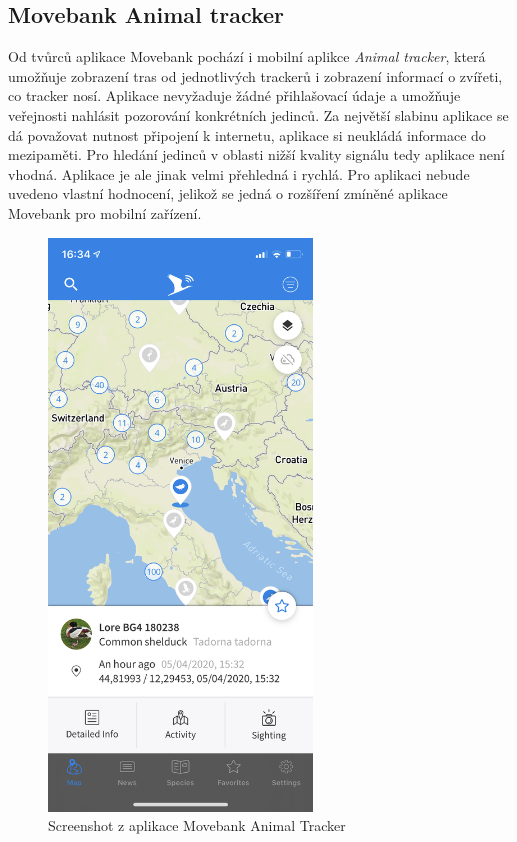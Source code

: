 \subsection{Movebank Animal tracker}

Od tvůrců aplikace Movebank pochází i mobilní aplikce \emph{Animal tracker}, která umožňuje zobrazení tras od jednotlivých trackerů i zobrazení informací o zvířeti, co tracker nosí. Aplikace nevyžaduje žádné přihlašovací údaje a umožňuje veřejnosti nahlásit pozorování konkrétních jedinců. Za největší slabinu aplikace se dá považovat nutnost připojení k internetu, aplikace si neukládá informace do mezipaměti. Pro hledání jedinců v oblasti nižší kvality signálu tedy aplikace není vhodná. Aplikace je ale jinak velmi přehledná i rychlá. Pro aplikaci nebude uvedeno vlastní hodnocení, jelikož se jedná o rozšíření zmíněné aplikace Movebank pro mobilní zařízení.

\begin{figure}[H]
	\begin{center}
		\includegraphics[width=70mm]{img/animaltracker_app_movebank.png}
	\end{center}
	\caption{Screenshot z aplikace Movebank Animal Tracker}
	\label{fig:movebank}
\end{figure}

